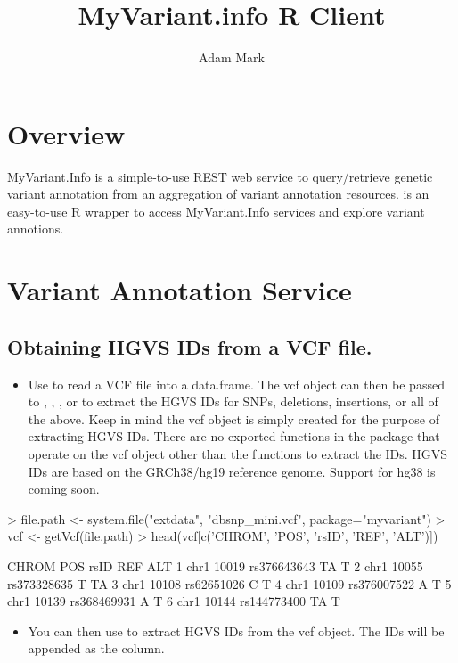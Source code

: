 \documentclass[12pt]{article}
\title{MyVariant.info R Client}
\author{Adam Mark}
\begin{document}


\maketitle

\tableofcontents

\section{Overview}

MyVariant.Info is a simple-to-use REST web service to query/retrieve genetic variant annotation from an aggregation of variant annotation resources.  is an easy-to-use R wrapper to access MyVariant.Info services and explore variant annotions.
\section{Variant Annotation Service}

\subsection{Obtaining HGVS IDs from a VCF file. }

\begin{itemize}
\item Use  to read a VCF file into a data.frame. The vcf object can then be passed to , , , or  to extract the HGVS IDs for SNPs, deletions, insertions, or all of the above. Keep in mind the vcf object is simply created for the purpose of extracting HGVS IDs. There are no exported functions in the  package that operate on the vcf object other than the functions to extract the IDs. HGVS IDs are based on the GRCh38/hg19 reference genome. Support for hg38 is coming soon.
\end{itemize} 


\begin{Schunk}
\begin{Sinput}
> file.path <- system.file("extdata", "dbsnp_mini.vcf", package="myvariant")
> vcf <- getVcf(file.path)
> head(vcf[c('CHROM', 'POS', 'rsID', 'REF', 'ALT')])
\end{Sinput}
\begin{Soutput}
  CHROM   POS        rsID REF ALT
1  chr1 10019 rs376643643  TA   T
2  chr1 10055 rs373328635   T  TA
3  chr1 10108  rs62651026   C   T
4  chr1 10109 rs376007522   A   T
5  chr1 10139 rs368469931   A   T
6  chr1 10144 rs144773400  TA   T
\end{Soutput}
\end{Schunk}
\begin{itemize}
\item You can then use  to extract HGVS IDs from the vcf object. The IDs will be appended as the  column.
\end{itemize}
\end{document}
